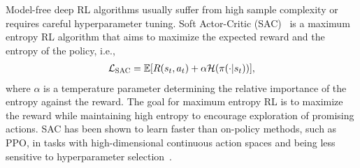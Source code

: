 Model-free deep RL algorithms usually suffer from high sample complexity or requires careful hyperparameter tuning. Soft Actor-Critic (SAC)~ is a maximum entropy RL algorithm that aims to maximize the expected reward and the entropy of the policy, i.e., 
\begin{align}\label{eq:sac_loss}
	{\mathcal{L}}_{\text{SAC}} = \mathbb{E}[R(s_t, a_t) + \alpha {\mathcal{H}}(\pi(\cdot | s_t))],
\end{align}
where $\alpha$ is a temperature parameter determining the relative importance of the entropy against the reward. The goal for maximum entropy RL is to maximize the reward while maintaining high entropy to encourage exploration of promising actions. SAC has been shown to learn faster than on-policy methods, such as PPO, in tasks with high-dimensional continuous action spaces and being less sensitive to hyperparameter selection~. 

